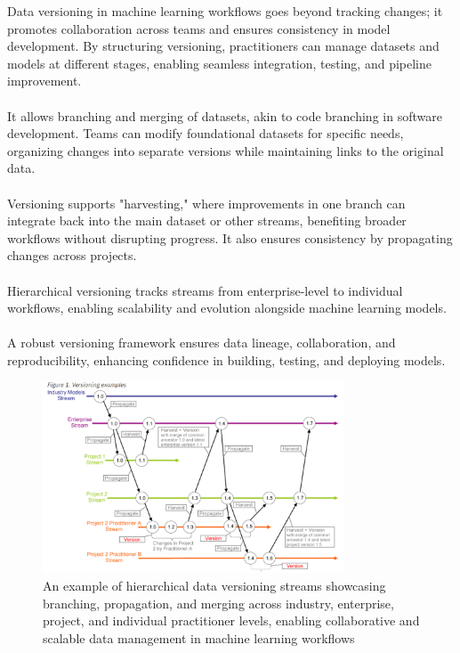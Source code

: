 Data versioning in machine learning workflows goes beyond 
tracking changes; it promotes collaboration across teams and 
ensures consistency in model development. By structuring 
versioning, practitioners can manage datasets and models at 
different stages, enabling seamless integration, testing, and 
pipeline improvement. \cite{wandb, opendatascience}
\\\\
It allows branching and merging of datasets, akin to code 
branching in software development. Teams can modify 
foundational datasets for specific needs, organizing changes 
into separate versions while maintaining links to the original 
data. \cite{wandb, opendatascience}
\\\\
Versioning supports "harvesting," where improvements in one 
branch can integrate back into the main dataset or other 
streams, benefiting broader workflows without disrupting 
progress. It also ensures consistency by propagating changes 
across projects. \cite{opendatascience, aimultiple}
\\\\
Hierarchical versioning tracks streams from enterprise-level 
to individual workflows, enabling scalability and evolution 
alongside machine learning models.
\cite{opendatascience, aimultiple}
\\\\
A robust versioning framework ensures data lineage, 
collaboration, and reproducibility, enhancing confidence in 
building, testing, and deploying models.
\cite{opendatascience, aimultiple}

\begin{figure}[H]
    \centering
    \includegraphics[width=0.8\textwidth]{fig/dv-advantages.png}
    \caption{An example of hierarchical data versioning 
        streams showcasing branching, propagation, and 
        merging across industry, enterprise, project, and 
        individual practitioner levels, enabling collaborative 
        and scalable data management in machine learning 
        workflows \cite{aimultiple}}
    \label{fig:dv-advantages}
\end{figure}
